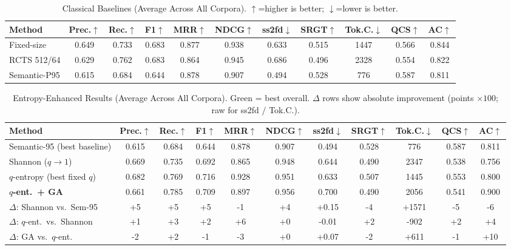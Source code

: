 \begin{table}[t]\centering
\caption{Classical Baselines (Average Across All Corpora). $\uparrow$=higher is better; $\downarrow$=lower is better.}
\label{tab:baselines}
\begin{tabular}{@{}lcccccccccc@{}}\toprule
Method & Prec.$\uparrow$ & Rec.$\uparrow$ & F1$\uparrow$ & MRR$\uparrow$ & NDCG$\uparrow$ & ss2fd$\downarrow$ & SRGT$\uparrow$ & Tok.C.$\downarrow$ & QCS$\uparrow$ & AC$\uparrow$ \\\midrule
Fixed-size & 0.649 & 0.733 & 0.683 & 0.877 & 0.938 & 0.633 & 0.515 & 1447 & 0.566 & 0.844 \\
RCTS 512/64 & 0.629 & 0.762 & 0.683 & 0.864 & 0.945 & 0.686 & 0.496 & 2328 & 0.554 & 0.822 \\
Semantic-P95 & 0.615 & 0.684 & 0.644 & 0.878 & 0.907 & 0.494 & 0.528 & 776 & 0.587 & 0.811 \\
\bottomrule\end{tabular}\end{table}

\begin{table}[t]\centering
\caption{Entropy-Enhanced Results (Average Across All Corpora). Green = best overall. $\Delta$ rows show absolute improvement (points $\times100$; raw for ss2fd / Tok.C.).}
\label{tab:entropy}
\begin{tabular}{@{}lcccccccccc@{}}\toprule
Method & Prec.$\uparrow$ & Rec.$\uparrow$ & F1$\uparrow$ & MRR$\uparrow$ & NDCG$\uparrow$ & ss2fd$\downarrow$ & SRGT$\uparrow$ & Tok.C.$\downarrow$ & QCS$\uparrow$ & AC$\uparrow$ \\\midrule
Semantic-95 (best baseline) & 0.615 & 0.684 & 0.644 & 0.878 & 0.907 & 0.494 & 0.528 & 776 & 0.587 & 0.811 \\\midrule
Shannon ($q\to1$) & 0.669 & 0.735 & 0.692 & 0.865 & 0.948 & 0.644 & 0.490 & 2347 & 0.538 & 0.756 \\
$q$-entropy (best fixed $q$) & 0.682 & 0.769 & 0.716 & 0.928 & 0.951 & 0.633 & 0.507 & 1445 & 0.553 & 0.800 \\
\rowcolor{green!18}\textbf{$q$-ent.\ + GA} & 0.661 & 0.785 & 0.709 & 0.897 & 0.956 & 0.700 & 0.490 & 2056 & 0.541 & 0.900 \\\midrule
$\Delta$: Shannon vs.\ Sem-95 & +5 & +5 & +5 & -1 & +4 & +0.15 & -4 & +1571 & -5 & -6 \\
$\Delta$: $q$-ent.\ vs.\ Shannon & +1 & +3 & +2 & +6 & +0 & -0.01 & +2 & -902 & +2 & +4 \\
$\Delta$: GA vs.\ $q$-ent. & -2 & +2 & -1 & -3 & +0 & +0.07 & -2 & +611 & -1 & +10 \\
\bottomrule\end{tabular}\end{table}

